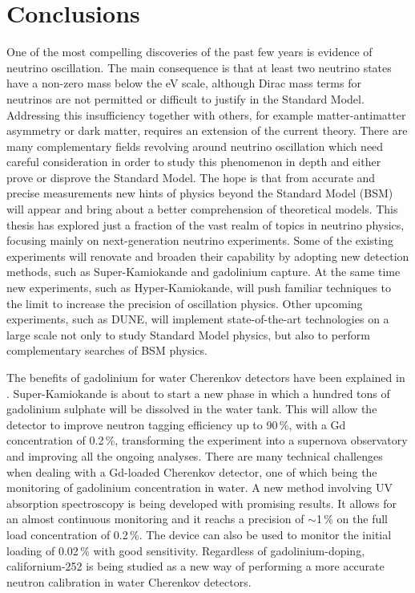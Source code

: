\clearpage
\chapter{Conclusions}
\label{sec:conclusions}

One of the most compelling discoveries of the past few years is evidence of neutrino oscillation.
The main consequence is that at least two neutrino states have %
a non-zero mass below the eV scale, although Dirac mass terms for neutrinos are not permitted or difficult to justify %
in the Standard Model.
Addressing this insufficiency together with others, for example matter-antimatter asymmetry or dark matter, %
requires an extension of the current theory.
There are many complementary fields revolving around neutrino oscillation %
which need careful consideration in order to study this phenomenon in depth and either prove or disprove the Standard Model.
The hope is that from accurate and precise measurements new hints of physics beyond the Standard Model (BSM) will appear %
and bring about a better comprehension of theoretical models.
This thesis has explored just a fraction of the vast realm of topics in neutrino physics, %
focusing mainly on next-generation neutrino experiments.
Some of the existing experiments will renovate and broaden their capability %
by adopting new detection methods, such as Super-Kamiokande and gadolinium capture.
At the same time new experiments, such as Hyper-Kamiokande, will %
push familiar techniques to the limit to increase the precision of oscillation physics.
Other upcoming experiments, such as DUNE, will implement state-of-the-art technologies on a large scale %
not only to study Standard Model physics, but also to perform complementary searches of BSM physics.

The benefits of gadolinium for water Cherenkov detectors have been explained in .
Super-Kamiokande is about to start a new phase in which a hundred tons of gadolinium sulphate %
will be dissolved in the water tank.
This will allow the detector to improve neutron tagging efficiency up to 90\,\%, with a Gd concentration of 0.2\,\%, %
transforming the experiment into a supernova observatory %
and improving all the ongoing analyses.
There are many technical challenges when dealing with a Gd-loaded Cherenkov detector, %
one of which being the monitoring of gadolinium concentration in water.
A new method involving UV absorption spectroscopy is being developed with promising results.
It allows for an almost continuous monitoring and it reachs a precision of $\sim$1\,\% %
on the full load concentration of 0.2\,\%.
The device can also be used to monitor the initial loading of 0.02\,\% with good sensitivity.
Regardless of gadolinium-doping, californium-252 is being studied as a new way of %
performing a more accurate neutron calibration in water Cherenkov detectors.

